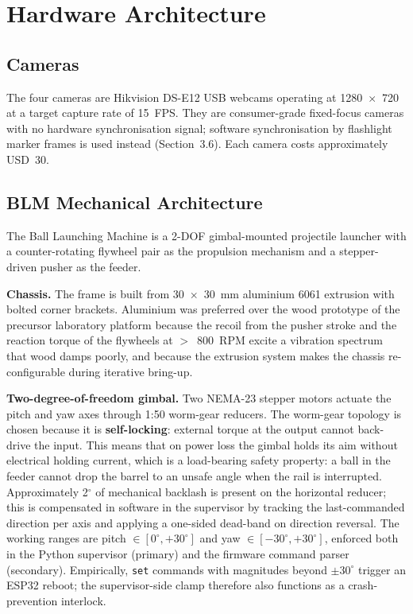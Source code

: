 \section{Hardware Architecture}

\subsection{Cameras}

The four cameras are Hikvision DS-E12 USB webcams operating at 1280~$\times$~720 at a target capture rate of 15~FPS. They are consumer-grade fixed-focus cameras with no hardware synchronisation signal; software synchronisation by flashlight marker frames is used instead (Section~3.6). Each camera costs approximately USD~30.

\subsection{BLM Mechanical Architecture}

The Ball Launching Machine is a 2-DOF gimbal-mounted projectile launcher with a counter-rotating flywheel pair as the propulsion mechanism and a stepper-driven pusher as the feeder.

\textbf{Chassis.} The frame is built from 30~$\times$~30~mm aluminium 6061 extrusion with bolted corner brackets. Aluminium was preferred over the wood prototype of the precursor laboratory platform because the recoil from the pusher stroke and the reaction torque of the flywheels at $>$~800~RPM excite a vibration spectrum that wood damps poorly, and because the extrusion system makes the chassis re-configurable during iterative bring-up.

\textbf{Two-degree-of-freedom gimbal.} Two NEMA-23 stepper motors actuate the pitch and yaw axes through 1:50 worm-gear reducers. The worm-gear topology is chosen because it is \textbf{self-locking}: external torque at the output cannot back-drive the input. This means that on power loss the gimbal holds its aim without electrical holding current, which is a load-bearing safety property: a ball in the feeder cannot drop the barrel to an unsafe angle when the rail is interrupted. Approximately 2$^\circ$ of mechanical backlash is present on the horizontal reducer; this is compensated in software in the supervisor by tracking the last-commanded direction per axis and applying a one-sided dead-band on direction reversal. The working ranges are pitch $\in [0^\circ, +30^\circ]$ and yaw $\in [-30^\circ, +30^\circ]$, enforced both in the Python supervisor (primary) and the firmware command parser (secondary). Empirically, \texttt{set} commands with magnitudes beyond $\pm 30^\circ$ trigger an ESP32 reboot; the supervisor-side clamp therefore also functions as a crash-prevention interlock.

